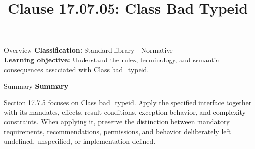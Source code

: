 \documentclass[10pt,letterpaper]{article}
\title{Clause 17.07.05: Class Bad Typeid}
\author{}
\date{}
\begin{document}
\maketitle
\begin{CornellOverviewBox}{Overview}
\textbf{Classification:} Standard library - Normative\\[2pt]
\textbf{Learning objective:} Understand the rules, terminology, and semantic consequences associated with Class bad\_typeid.
\end{CornellOverviewBox}\begin{CornellSummaryBox}{Summary}
{\sffamily\bfseries\color{Accent} Summary}\par\vspace{3pt}Section 17.7.5 focuses on Class bad\_typeid. Apply the specified interface together with its mandates, effects, result conditions, exception behavior, and complexity constraints. When applying it, preserve the distinction between mandatory requirements, recommendations, permissions, and behavior deliberately left undefined, unspecified, or implementation-defined.
\end{CornellSummaryBox}
\end{document}
